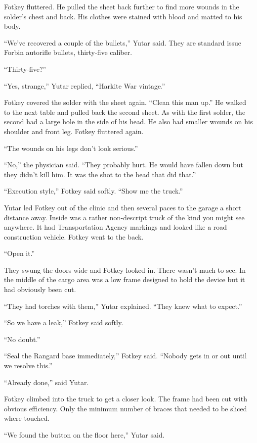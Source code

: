 Fotkey fluttered. He pulled the sheet back further to find more wounds in the solder's chest and
back. His clothes were stained with blood and matted to his body.

``We've recovered a couple of the bullets,'' Yutar said. They are standard issue Forbin
autorifle bullets, thirty-five caliber.

``Thirty-five?''

``Yes, strange,'' Yutar replied, ``Harkite War vintage.''

Fotkey covered the solder with the sheet again. ``Clean this man up.'' He walked to the next
table and pulled back the second sheet. As with the first solder, the second had a large hole in
the side of his head. He also had smaller wounds on his shoulder and front leg. Fotkey fluttered
again.

``The wounds on his legs don't look serious.''

``No,'' the physician said. ``They probably hurt. He would have fallen down but they didn't kill
him. It was the shot to the head that did that.''

``Execution style,'' Fotkey said softly. ``Show me the truck.''

Yutar led Fotkey out of the clinic and then several paces to the garage a short distance away.
Inside was a rather non-descript truck of the kind you might see anywhere. It had Transportation
Agency markings and looked like a road construction vehicle. Fotkey went to the back.

``Open it.''

They swung the doors wide and Fotkey looked in. There wasn't much to see. In the middle of the
cargo area was a low frame designed to hold the device but it had obviously been cut.

``They had torches with them,'' Yutar explained. ``They knew what to expect.''

``So we have a leak,'' Fotkey said softly.

``No doubt.''

``Seal the Rangard base immediately,'' Fotkey said. ``Nobody gets in or out until we resolve
this.''

``Already done,'' said Yutar.

Fotkey climbed into the truck to get a closer look. The frame had been cut with obvious
efficiency. Only the minimum number of braces that needed to be sliced where touched.

``We found the button on the floor here,'' Yutar said.

